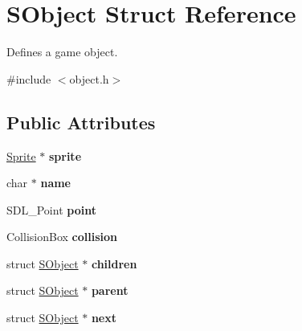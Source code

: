 \hypertarget{structSObject}{\section{S\-Object Struct Reference}
\label{structSObject}
}


Defines a game object.  




{\ttfamily \#include $<$object.\-h$>$}

\subsection*{Public Attributes}
\begin{DoxyCompactItemize}
\item 
\hypertarget{structSObject_a6424528b589d7a8d60cb8999fd8fb5e7}{\hyperlink{structSSprite}{Sprite} $\ast$ {\bfseries sprite}}\label{structSObject_a6424528b589d7a8d60cb8999fd8fb5e7}

\item 
\hypertarget{structSObject_a8f2ae1a56f73fa95f8a89ba97d8849e2}{char $\ast$ {\bfseries name}}\label{structSObject_a8f2ae1a56f73fa95f8a89ba97d8849e2}

\item 
\hypertarget{structSObject_a0474139d7d390aa4765d3f5c9ece1f64}{S\-D\-L\-\_\-\-Point {\bfseries point}}\label{structSObject_a0474139d7d390aa4765d3f5c9ece1f64}

\item 
\hypertarget{structSObject_aae65de566b1cc893cc0a6508407f8831}{Collision\-Box {\bfseries collision}}\label{structSObject_aae65de566b1cc893cc0a6508407f8831}

\item 
\hypertarget{structSObject_acded767110b3756afe2ccdf4806dd798}{struct \hyperlink{structSObject}{S\-Object} $\ast$ {\bfseries children}}\label{structSObject_acded767110b3756afe2ccdf4806dd798}

\item 
\hypertarget{structSObject_af8173e9aa7de194334ed283c0d785b85}{struct \hyperlink{structSObject}{S\-Object} $\ast$ {\bfseries parent}}\label{structSObject_af8173e9aa7de194334ed283c0d785b85}

\item 
\hypertarget{structSObject_a982026419c015025155f5b983afaf942}{struct \hyperlink{structSObject}{S\-Object} $\ast$ {\bfseries next}}\label{structSObject_a982026419c015025155f5b983afaf942}

\end{DoxyCompactItemize}


